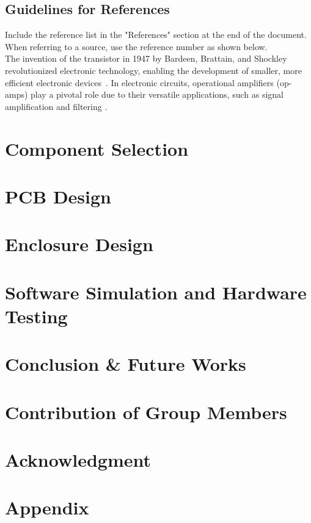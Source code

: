 \documentclass{article}
\begin{document}
\subsection{Guidelines for References}
Include the reference list in the "References" section at the end of the document.  When referring to a source, use the reference number as shown below.\\
The invention of the transistor in 1947 by Bardeen, Brattain, and Shockley revolutionized electronic technology, enabling the development of smaller, more efficient electronic devices~\cite{bardeen1948transistor}. In electronic circuits, operational amplifiers (op-amps) play a pivotal role due to their versatile applications, such as signal amplification and filtering \cite{sedra_smith_microelectronic_circuits}.
	
	

	\section{Component Selection}
	
	
	\section{PCB Design}
	
	
	\section{Enclosure Design}
	
	\section{Software Simulation and Hardware Testing}

	
	\section{Conclusion \& Future Works}
	
	\section{Contribution of Group Members}
	
	
	\section*{Acknowledgment}

	
	



	
	\section*{Appendix}

	
\end{document}
